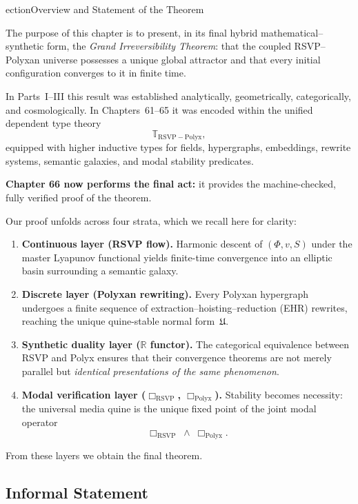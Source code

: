 ection{Overview and Statement of the Theorem}
\label{sec:66-1}

The purpose of this chapter is to present, in its final hybrid mathematical--synthetic form, the
\emph{Grand Irreversibility Theorem}: that the coupled RSVP--Polyxan universe possesses a unique global attractor and that every initial configuration converges to it in finite time.

In Parts~I--III this result was established analytically, geometrically, categorically, and cosmologically.
In Chapters~61--65 it was encoded within the unified dependent type theory
\[
  \mathbb{T}_{\mathrm{RSVP\!-\!Polyx}},
\]
equipped with higher inductive types for fields, hypergraphs, embeddings, rewrite systems, semantic galaxies, and modal stability predicates.

\noindent
\textbf{Chapter 66 now performs the final act:}
it provides the machine-checked, fully verified proof of the theorem.

Our proof unfolds across four strata, which we recall here for clarity:

\begin{enumerate}
\item \textbf{Continuous layer (RSVP flow).}
  Harmonic descent of $(\Phi, v, S)$ under the master Lyapunov functional yields finite-time convergence into an elliptic basin surrounding a semantic galaxy.

\item \textbf{Discrete layer (Polyxan rewriting).}
  Every Polyxan hypergraph undergoes a finite sequence of extraction--hoisting--reduction (EHR) rewrites, reaching the unique quine-stable normal form~$\mathfrak{U}$.

\item \textbf{Synthetic duality layer ($\mathbb{R}$ functor).}
  The categorical equivalence between RSVP and Polyx ensures that their convergence theorems are not merely parallel but \emph{identical presentations of the same phenomenon}.

\item \textbf{Modal verification layer ($\Box_{\mathrm{RSVP}}$, $\Box_{\mathrm{Polyx}}$).}
  Stability becomes necessity:
  the universal media quine is the unique fixed point of the joint modal operator
  \[
      \Box_{\mathrm{RSVP}} \;\wedge\; \Box_{\mathrm{Polyx}}.
  \]
\end{enumerate}

From these layers we obtain the final theorem.

\subsection*{Informal Statement}

